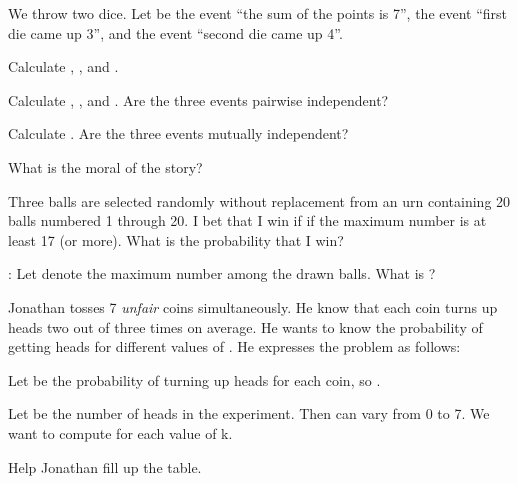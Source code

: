 	\stopsection


	\page


	\startsection [title={2019-06-27}]
		
		\startexercise [title={Mutual and pairwise independence}]
			We throw two dice. Let  be the event “the sum of the points is 7”,  the event “first die came up 3”, and  the event “second die came up 4”.
			\startitemize [m, joinedup]
				\item  Calculate , , and .
				\item  Calculate , , and . Are the three events pairwise independent?
				\item  Calculate . Are the three events mutually independent?
				\item  What is the moral of the story?
			\stopitemize
		\stopexercise

		\startexercise [title={Betting}]
			Three balls are selected randomly without replacement from an urn containing 20 balls numbered 1 through 20. I bet that I win if if the maximum number is at least 17 (or more). What is the probability that I win?

			: Let  denote the maximum number among the drawn balls. What is ?
		\stopexercise

		\startexercise [title={\emph{Binomial} random variables}]
			Jonathan tosses 7 \emph{unfair} coins simultaneously. He know that each coin turns up heads two out of three times on average. He wants to know the probability of getting  heads for different values of . He expresses the problem as follows:

			Let  be the probability of turning up heads for each coin, so .

			Let  be the number of heads in the experiment. Then  can vary from 0 to 7. We want to compute  for each value of k.

			Help Jonathan fill up the table.
				\item  {}
				\item  {}
				\item  {}
				\item  {}
				\item  {}
				\item  {}
				\item  {}
				\item  {}
			\stopitemize

